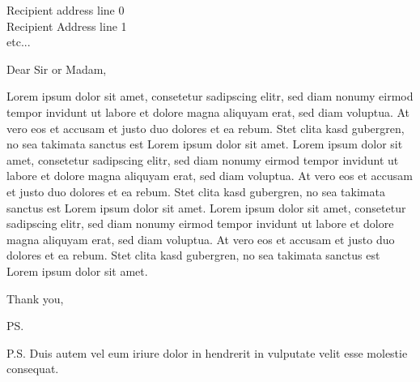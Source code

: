 \documentclass[a4paper]{letter}
\begin{document}
\begin{letter}{Recipient address line 0 \\ Recipient Address line 1 \\ etc...}

\opening{Dear Sir or Madam,}



Lorem ipsum dolor sit amet, consetetur sadipscing elitr, sed diam nonumy eirmod tempor invidunt ut labore et dolore magna aliquyam erat, sed diam voluptua. At vero eos et accusam et justo duo dolores et ea rebum. Stet clita kasd gubergren, no sea takimata sanctus est Lorem ipsum dolor sit amet. Lorem ipsum dolor sit amet, consetetur sadipscing elitr, sed diam nonumy eirmod tempor invidunt ut labore et dolore magna aliquyam erat, sed diam voluptua. At vero eos et accusam et justo duo dolores et ea rebum. Stet clita kasd gubergren, no sea takimata sanctus est Lorem ipsum dolor sit amet. Lorem ipsum dolor sit amet, consetetur sadipscing elitr, sed diam nonumy eirmod tempor invidunt ut labore et dolore magna aliquyam erat, sed diam voluptua. At vero eos et accusam et justo duo dolores et ea rebum. Stet clita kasd gubergren, no sea takimata sanctus est Lorem ipsum dolor sit amet. 


\closing{Thank you,}

\ps %

P.S. Duis autem vel eum iriure dolor in hendrerit in vulputate velit esse molestie consequat.

\end{letter}
\end{document}
